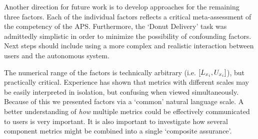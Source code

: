 Another direction for future work is to develop approaches for the remaining three \famsec{} factors. Each of the individual factors reflects a critical meta-assessment of the competency of the APS. Furthermore, the `Donut Delivery' task was admittedly simplistic in order to minimize the possibility of confounding factors. Next steps should include using a more complex and realistic interaction between users and the autonomous system.

The numerical range of the \famsec{} factors is technically arbitrary (i.e. $[L_{x_i},U_{x_i}]$), but practically critical. Experience has shown that metrics with different scales may be easily interpreted in isolation, but confusing when viewed simultaneously. Because of this we presented factors via a `common' natural language scale. A better understanding of \emph{how} multiple metrics could be effectively communicated to users is very important. It is also important to investigate how several component metrics might be combined into a single `composite assurance'.
